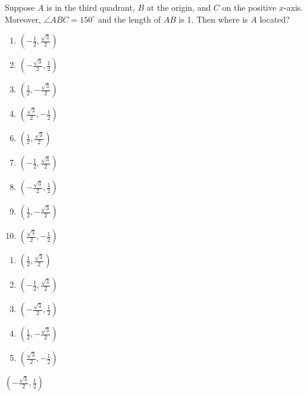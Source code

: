 


 Suppose $A$ is in the third quadrant, $B$ at the origin, and $C$ on the positive $x$-axis.  Moreover, $\angle ABC = 150^\circ$ and the length of $AB$ is 1.  Then where is $A$ located?


\ifsat
	\begin{enumerate}[label=\Alph*)]
		\item  $(-\frac{1}{2},\frac{\sqrt{3}}{2})$ 
		\item $(-\frac{\sqrt{3}}{2},\frac{1}{2})$ %
		\item $(\frac{1}{2},-\frac{\sqrt{3}}{2})$
		\item $(\frac{\sqrt{3}}{2},-\frac{1}{2})$
	\end{enumerate}
\else
\fi

\ifacteven
	\begin{enumerate}[label=\textbf{\Alph*.},itemsep=\fill,align=left]
		\setcounter{enumii}{5}
		\item    $(\frac{1}{2},\frac{\sqrt{3}}{2})$  
		\item  $(-\frac{1}{2},\frac{\sqrt{3}}{2})$ 
		\item $(-\frac{\sqrt{3}}{2},\frac{1}{2})$ %
		\addtocounter{enumii}{1}
		\item $(\frac{1}{2},-\frac{\sqrt{3}}{2})$
		\item $(\frac{\sqrt{3}}{2},-\frac{1}{2})$
	\end{enumerate}
\else
\fi

\ifactodd
	\begin{enumerate}[label=\textbf{\Alph*.},itemsep=\fill,align=left]
		\item    $(\frac{1}{2},\frac{\sqrt{3}}{2})$  
		\item  $(-\frac{1}{2},\frac{\sqrt{3}}{2})$ 
		\item $(-\frac{\sqrt{3}}{2},\frac{1}{2})$ %
		\item $(\frac{1}{2},-\frac{\sqrt{3}}{2})$
		\item $(\frac{\sqrt{3}}{2},-\frac{1}{2})$
	\end{enumerate}
\else
\fi

\ifgridin
 $(-\frac{\sqrt{3}}{2},\frac{1}{2})$ %
		
\else
\fi

